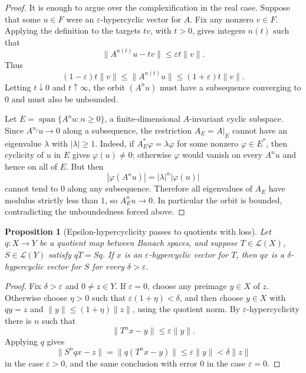 \documentclass[11pt]{article}
\newtheorem{proposition}{Proposition}
\newcommand{\eps}{\varepsilon}
\begin{document}
\begin{proof}
It is enough to argue over the complexification in the real case.  Suppose that
some \(u\in F\) were an \(\eps\)-hypercyclic vector for \(A\).  Fix any
nonzero \(v\in F\).  Applying the definition to the targets \(t v\), with
\(t>0\), gives integers \(n(t)\) such that
\[
  \|A^{n(t)}u-tv\|\leq \eps t\|v\|.
\]
Thus
\[
  (1-\eps)t\|v\|\leq \|A^{n(t)}u\|
  \leq (1+\eps)t\|v\|.
\]
Letting \(t\downarrow0\) and \(t\uparrow\infty\), the orbit
\((A^n u)\) must have a subsequence converging to \(0\) and must also be
unbounded.

Let \(E=\operatorname{span}\{A^n u:n\geq0\}\), a finite-dimensional
\(A\)-invariant cyclic subspace.  Since \(A^{n_j}u\to0\) along a subsequence,
the restriction \(A_E=A|_E\) cannot have an eigenvalue \(\lambda\) with
\(|\lambda|\geq1\).  Indeed, if \(A_E^*\varphi=\lambda\varphi\) for some
nonzero \(\varphi\in E^*\), then cyclicity of \(u\) in \(E\) gives
\(\varphi(u)\neq0\); otherwise \(\varphi\) would vanish on every \(A^n u\) and
hence on all of \(E\).  But then
\[
  |\varphi(A^n u)|=|\lambda|^n|\varphi(u)|
\]
cannot tend to \(0\) along any subsequence.  Therefore all eigenvalues of
\(A_E\) have modulus strictly less than \(1\), so \(A_E^n u\to0\).  In
particular the orbit is bounded, contradicting the unboundedness forced above.
\end{proof}

\begin{proposition}[Epsilon-hypercyclicity passes to quotients with loss]
\label{prop:quotient}
Let \(q:X\to Y\) be a quotient map between Banach spaces, and suppose
\(T\in\mathcal L(X)\), \(S\in\mathcal L(Y)\) satisfy \(qT=Sq\).  If \(x\) is
an \(\eps\)-hypercyclic vector for \(T\), then \(qx\) is a \(\delta\)-hypercyclic
vector for \(S\) for every \(\delta>\eps\).
\end{proposition}

\begin{proof}
Fix \(\delta>\eps\) and \(0\neq z\in Y\).  If \(\eps=0\), choose any
preimage \(y\in X\) of \(z\).  Otherwise choose \(\eta>0\) such that
\(\eps(1+\eta)<\delta\), and then choose \(y\in X\) with \(q y=z\) and
\(\|y\|\leq(1+\eta)\|z\|\), using the quotient norm.  By
\(\eps\)-hypercyclicity there is \(n\) such that
\[
  \|T^n x-y\|\leq \eps\|y\|.
\]
Applying \(q\) gives
\[
  \|S^n qx-z\|
  =\|q(T^n x-y)\|
  \leq \eps\|y\|
  < \delta\|z\|
\]
in the case \(\eps>0\), and the same conclusion with error \(0\) in the case
\(\eps=0\).
\end{proof}
\end{document}
